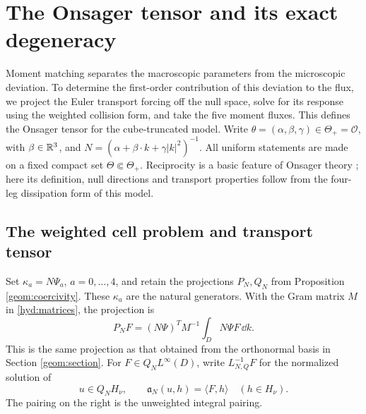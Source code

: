 \section{The Onsager tensor and its exact degeneracy}
\label{ons:section}

Moment matching separates the macroscopic parameters from the microscopic
deviation. To determine the first-order contribution of this deviation to
the flux, we project the Euler transport forcing off the null space,
solve for its response using the weighted collision form, and take the
five moment fluxes. This defines the Onsager tensor for the cube-truncated model.
Write $\theta=(\alpha,\beta,\gamma)\in\Theta_+=\mathcal O$, with
$\beta\in\mathbb R^3$, and
$N=(\alpha+\beta\cdot k+\gamma|k|^2)^{-1}$.
All uniform statements are made on a fixed compact set
$\Theta\Subset\Theta_+$. Reciprocity is a basic feature of Onsager theory
\cite{Onsager1931}; here its definition, null directions and transport
properties follow from the four-leg dissipation form of this model.

\subsection{The weighted cell problem and transport tensor}

Set $\kappa_a=N\Psi_a$, $a=0,\ldots,4$, and retain the projections
$P_N,Q_N$ from Proposition \ref{geom:coercivity}.
These $\kappa_a$ are the natural generators. With the Gram matrix $M$
in \eqref{hyd:matrices}, the projection is
\[
 P_NF=(N\Psi)^TM^{-1}\int_DN\Psi F\,\dd k.
\]
This is the same projection as that obtained from the orthonormal basis
in Section \ref{geom:section}. For $F\in Q_NL^\infty(D)$, write
$L_{N,Q}^{-1}F$ for the normalized solution of
\begin{equation}\label{ons:weighted-cell}
 u\in Q_NH_\nu,\qquad
 \mathfrak a_N(u,h)=\langle F,h\rangle
 \quad(h\in H_\nu).
\end{equation}
The pairing on the right is the unweighted integral pairing.

